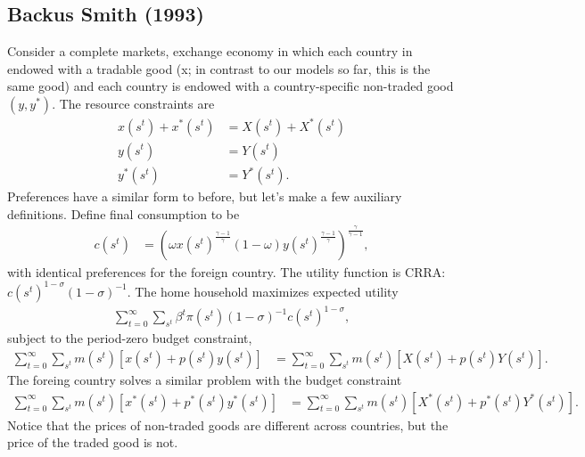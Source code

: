 \documentclass[11pt,pdftex,twoside,letterpaper]{exam}
\begin{document}
\subsection{Backus Smith (1993)}
Consider a complete markets, exchange economy in which each country in endowed with a tradable good (x; in contrast to our models so far, this is the same good) and each country is endowed with a country-specific non-traded good $(y, y^*)$. The resource constraints are
\begin{align}
  x(s^t)+x^*(s^t)&=X(s^t)+X^*(s^t)\\
  y(s^t) &= Y(s^t)\\
  y^*(s^t)&=Y^*(s^t).
\end{align}
Preferences have a similar form to before, but let's make a few auxiliary definitions. Define final consumption to be
\begin{align}
c(s^t) &= \left( \omega x(s^t)^\frac{\gamma-1}{\gamma} (1-\omega)y(s^t)^\frac{\gamma-1}{\gamma}\right)^\frac{\gamma}{\gamma-1},
\end{align}
with identical preferences for the foreign country. The utility function is CRRA: $c(s^t)^{1-\sigma}(1-\sigma)^{-1}$. The home household maximizes expected utility
\begin{align}
  \sum_{t=0}^{\infty}\sum_{s^t}\beta^t \pi(s^t)(1-\sigma)^{-1}c(s^t)^{1-\sigma},
\end{align}
subject to the period-zero budget constraint,
\begin{align}
  \sum_{t=0}^\infty\sum_{s^t}m(s^t)\left[ x(s^t)+p(s^t)y(s^t) \right]&=\sum_{t=0}^\infty\sum_{s^t}m(s^t)\left[ X(s^t)+p(s^t)Y(s^t) \right].
\end{align}
The foreing country solves a similar problem with the budget constraint
\begin{align}
  \sum_{t=0}^\infty\sum_{s^t}m(s^t)\left[ x^*(s^t)+p^*(s^t)y^*(s^t) \right]&=\sum_{t=0}^\infty\sum_{s^t}m(s^t)\left[ X^*(s^t)+p^*(s^t)Y^*(s^t) \right].
\end{align}
Notice that the prices of non-traded goods are different across countries, but the price of the traded good is not.
\end{document}
